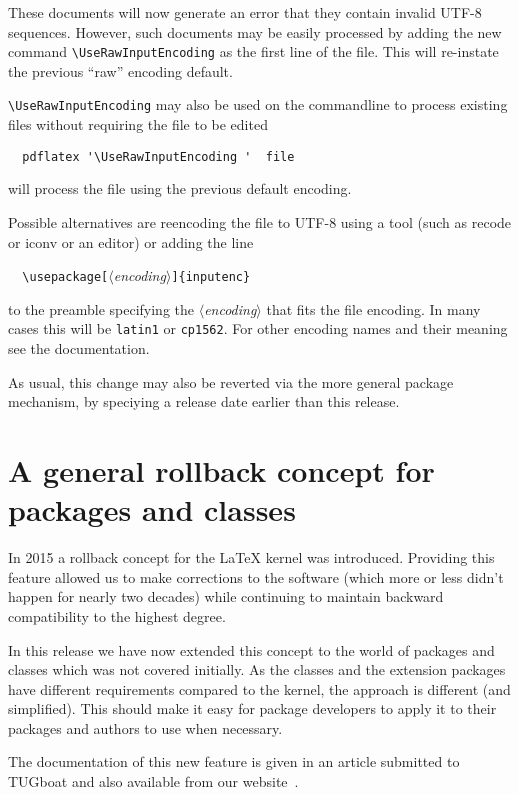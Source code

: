 \documentclass{ltnews}
\providecommand\meta[1]{$\langle$\textit{#1}$\rangle$}
\begin{document}
These documents will now generate an error that they contain invalid
UTF-8 sequences.  However, such documents may be easily processed by
adding the new command \verb|\UseRawInputEncoding| as the first line
of the file. This will re-instate the previous ``raw'' encoding
default.

\verb|\UseRawInputEncoding| may also be used on the commandline to
process existing files without requiring the file to be edited
\begin{verbatim}
  pdflatex '\UseRawInputEncoding '  file
\end{verbatim}
will process the file using the previous default encoding.

Possible alternatives are reencoding the file to UTF-8 using a tool
(such as recode or iconv or an editor) or adding the line
\begin{flushleft}
\verb=  \usepackage[=\meta{encoding}\verb=]{inputenc}=
\end{flushleft}
to the preamble specifying the \meta{encoding} that fits the file
encoding.  In many cases this will be \texttt{latin1} or
\texttt{cp1562}. For other encoding names and their meaning see the
 documentation.

As usual, this change may also be reverted via the more general
 package mechanism, by speciying a release date
earlier than this release.

\section[A general rollback concept]
        {A general rollback concept for packages and classes}

  In 2015 a rollback concept for the \LaTeX{} kernel was introduced.
  Providing this feature allowed us to make corrections to the
  software (which more or less didn't happen for nearly two decades)
  while continuing to maintain backward compatibility to the highest
  degree.
  
  In this release we have now extended this concept to
  the world of packages and classes which was not covered
  initially. As the classes and the extension packages have different
  requirements compared to the kernel, the approach is different (and
  simplified). This should make it easy for package developers to
  apply it to their packages and authors to use when necessary.

  The documentation of this new feature is given in an article
  submitted to TUGboat and also available from our
  website~\cite{Mittelbach:TB39-2}.
\end{document}
